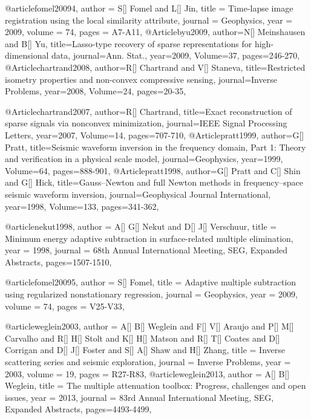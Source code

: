@article{fomel20094,
  author =	 {S[] Fomel and L[] Jin},
  title =	 {Time-lapse image registration using the local similarity attribute},
  journal = 	 {Geophysics},
  year = 	 2009,
  volume =	 74,
  pages =	 {A7-A11},
}
@Article{byu2009,
  author={N[] Meinshausen and B[] Yu},
  title={Lasso-type recovery of sparse representations for high-dimensional data},
  journal={Ann. Stat.},
  year=2009,
  Volume=37,
  pages={246-270},
}
@Article{chartrand2008,
  author={R[] Chartrand and V[] Staneva},
  title={Restricted isometry properties and non-convex compressive sensing},
  journal={Inverse Problems},
  year=2008,
  Volume=24,
  pages={20-35},
}

@Article{chartrand2007,
  author={R[] Chartrand},
  title={Exact reconstruction of sparse signals via nonconvex minimization},
  journal={IEEE Signal Processing Letters},
  year=2007,
  Volume=14,
  pages={707-710},
}
@Article{pratt1999,
  author={G[] Pratt},
  title={Seismic waveform inversion in the frequency domain, Part 1: Theory and verification in a physical scale model},
  journal={Geophysics},
  year=1999,
  Volume=64,
  pages={888-901},
}
@Article{pratt1998,
  author={G[] Pratt and C[] Shin and G[] Hick},
  title={Gauss–Newton and full Newton methods in frequency–space seismic waveform inversion},
  journal={Geophysical Journal International},
  year=1998,
  Volume=133,
  pages={341-362},
}

@article{nekut1998,
  author =	 {A[] G[] Nekut and D[] J[] Verschuur},
  title =	 {Minimum energy adaptive subtraction in surface-related multiple elimination},
  year =	 1998,
  journal =	 {68th Annual International Meeting, SEG, Expanded Abstracts},
 pages=1507-1510,
}

@article{fomel20095,
  author =	 {S[] Fomel},
  title =	 {Adaptive multiple subtraction using regularized nonstationary regression},
  journal = 	 {Geophysics},
  year = 	 2009,
  volume =	 74,
  pages =	 {V25-V33},
}

@article{weglein2003,
  author =	 {A[] B[] Weglein and F[] V[] Araujo and P[] M[] Carvalho and R[] H[] Stolt and K[] H[] Matson and R[] T[] Coates and D[] Corrigan and D[] J[] Foster and S[] A[] Shaw and H[] Zhang},
  title =	 {Inverse scattering series and seismic exploration},
  journal = 	 {Inverse Problems},
  year = 	 2003,
  volume =	 19,
  pages =	 {R27-R83},
}
@article{weglein2013,
  author =	 {A[] B[] Weglein},
  title =	 {The multiple attenuation toolbox: Progress, challenges and open issues},
  year =	 2013,
  journal =	 {83rd Annual International Meeting, SEG, Expanded Abstracts},
 pages=4493-4499,
}

